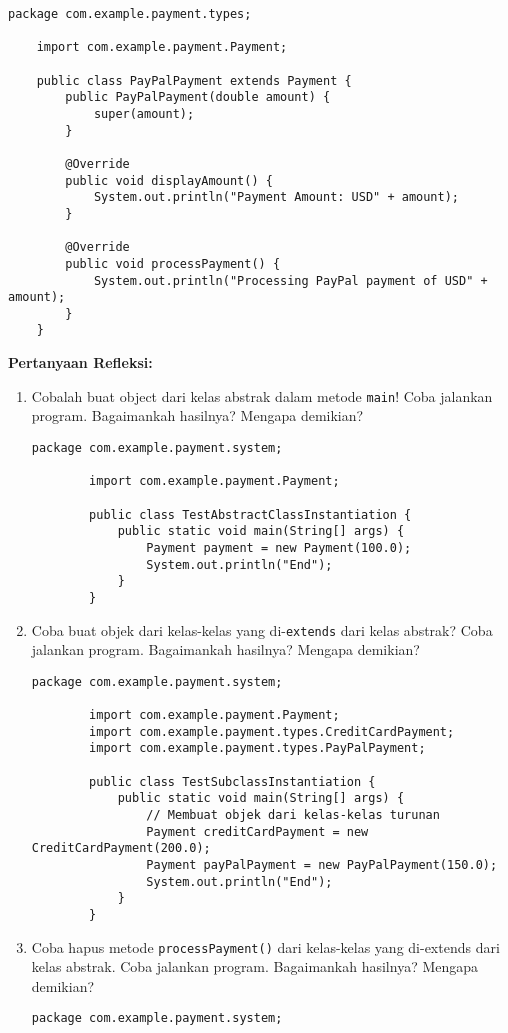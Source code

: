 \begin{lstlisting}[style=JavaStyle, caption={PayPalPayment.java}]
	package com.example.payment.types;
	
	import com.example.payment.Payment;
	
	public class PayPalPayment extends Payment {
		public PayPalPayment(double amount) {
			super(amount);
		}
		
		@Override
		public void displayAmount() {
			System.out.println("Payment Amount: USD" + amount);
		}
		
		@Override
		public void processPayment() {
			System.out.println("Processing PayPal payment of USD" + amount);
		}
	}
\end{lstlisting}

\textbf{Pertanyaan Refleksi:}
\begin{enumerate}
	\item Cobalah buat object dari kelas abstrak dalam metode \texttt{main}! Coba jalankan program. Bagaimankah hasilnya? Mengapa demikian?
	\begin{lstlisting}[style=JavaStyle, caption={TestAbstractClassInstantiation.java}]
		package com.example.payment.system;
		
		import com.example.payment.Payment;
		
		public class TestAbstractClassInstantiation {
			public static void main(String[] args) {
				Payment payment = new Payment(100.0);
				System.out.println("End");
			}
		}
	\end{lstlisting}
	\begin{tcolorbox}[colback=white, colframe=black,  width=\linewidth, height=3cm,  boxrule=1pt, sharp corners]
	\end{tcolorbox}
	\item Coba buat objek dari kelas-kelas yang di-\texttt{extends} dari kelas abstrak? Coba jalankan program. Bagaimankah hasilnya? Mengapa demikian?
	\begin{lstlisting}[style=JavaStyle, caption={TestSubclassInstantiation.java}]
		package com.example.payment.system;
		
		import com.example.payment.Payment;
		import com.example.payment.types.CreditCardPayment;
		import com.example.payment.types.PayPalPayment;
		
		public class TestSubclassInstantiation {
			public static void main(String[] args) {
				// Membuat objek dari kelas-kelas turunan
				Payment creditCardPayment = new CreditCardPayment(200.0);
				Payment payPalPayment = new PayPalPayment(150.0);
				System.out.println("End");
			}
		}
	\end{lstlisting}
	\begin{tcolorbox}[colback=white, colframe=black,  width=\linewidth, height=3cm,  boxrule=1pt, sharp corners]
	\end{tcolorbox}
	\item Coba hapus metode \texttt{processPayment()} dari kelas-kelas yang di-extends dari kelas abstrak. Coba jalankan program. Bagaimankah hasilnya? Mengapa demikian?
	\begin{lstlisting}[style=JavaStyle, caption={TestSubclassInstantiation.java}]
		package com.example.payment.system;
		

\end{lstlisting}
\end{enumerate}
